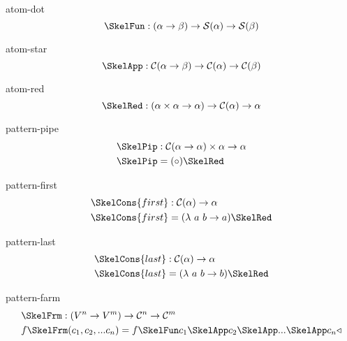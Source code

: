 \documentclass[preview]{standalone}
\begin{document}
\begin{docimage}{atom-dot}
  \begin{equation*}%
    \SkelFun :
    ({\alpha \rightarrow \beta})
    \rightarrow \mathcal{S}(\alpha) \rightarrow \mathcal{S}(\beta)
  \end{equation*}
\end{docimage} 

\begin{docimage}{atom-star}
  \begin{equation*}%
    \SkelApp :
    \mathcal{C}({\alpha \rightarrow \beta})
    \rightarrow \mathcal{C}(\alpha) \rightarrow \mathcal{C}(\beta)
  \end{equation*}
\end{docimage}

\begin{docimage}{atom-red}
  \begin{equation*}%
    \SkelRed :
    (\alpha \times \alpha \rightarrow \alpha)
    \rightarrow \mathcal{C}(\alpha) \rightarrow \alpha
  \end{equation*}
\end{docimage} 


\begin{docimage}{pattern-pipe}
\begin{align*}
  \SkelPip &: \mathcal{C}(\alpha \rightarrow \alpha) \times \alpha \rightarrow \alpha \\
  \SkelPip &= (\circ) \SkelRed
\end{align*}
\end{docimage} 

\begin{docimage}{pattern-first}
\begin{align*}
  \SkelCons{first} &: \mathcal{C}(\alpha) \rightarrow \alpha \\
  \SkelCons{first} &= (\lambda\ a\ b \rightarrow a) \SkelRed
\end{align*}
\end{docimage} 

\begin{docimage}{pattern-last}
\begin{align*}
  \SkelCons{last} &: \mathcal{C}(\alpha) \rightarrow \alpha \\
  \SkelCons{last} &= (\lambda\ a\ b \rightarrow b) \SkelRed
\end{align*}
\end{docimage} 

\begin{docimage}{pattern-farm}
  \begin{align*}%
    &\SkelFrm :
      ({{V}^n \rightarrow {V}^m})
      \rightarrow \mathcal{C}^n \rightarrow \mathcal{C}^m \\
    &f \SkelFrm (c_1,c_2,...c_n) =
      f \SkelFun c_1 \SkelApp c_2 \SkelApp ... \SkelApp c_n \triangleleft
  \end{align*}
\end{docimage}
\end{document}
